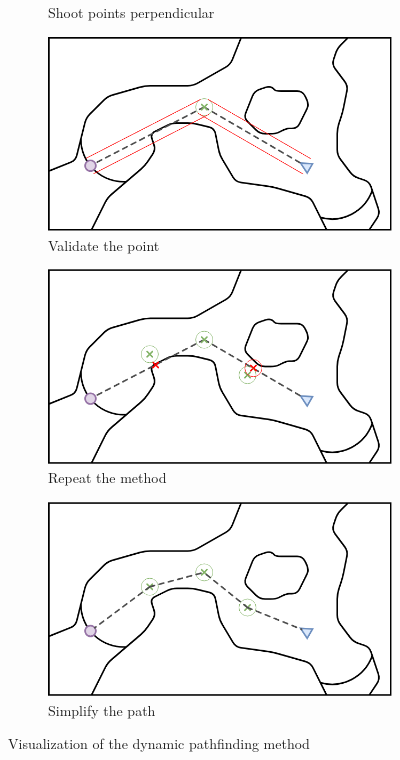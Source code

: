 \documentclass[../main.tex]{subfiles}
\begin{document}
\begin{figure}[H]
\begin{subfigure}[b]{0.45\textwidth}
		\caption{Shoot points perpendicular}
		\label{fig:shoot_line}
	\end{subfigure}
	\hfill
	\begin{subfigure}[b]{0.45\textwidth}
		\centering
		\includegraphics[width=\textwidth]{IMAGES/part3/methode4.png}
		\caption{Validate the point}
		\label{fig:validate_point}
	\end{subfigure}
	\vfill
	\begin{subfigure}[b]{0.45\textwidth}
		\centering
		\includegraphics[width=\textwidth]{IMAGES/part3/methode5.png}
		\caption{Repeat the method}
		\label{fig:repeat_method}
	\end{subfigure}
	\hfill
	\begin{subfigure}[b]{0.45\textwidth}
		\centering
		\includegraphics[width=\textwidth]{IMAGES/part3/methode6.png}
		\caption{Simplify the path}
		\label{fig:idk}
	\end{subfigure}
	\caption{Visualization of the dynamic pathfinding method}
	\label{fig:method_visu}
\end{figure}
\end{document}

